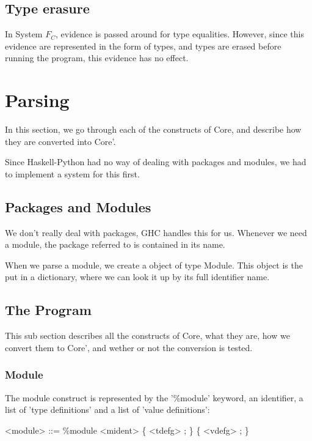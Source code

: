 \subsection{Type erasure}

In System $F_C$, evidence is passed around for type equalities. However,
since this evidence are represented in the form of types, and types are
erased before running the program, this evidence has no effect.
\cite{sulzmann2007system}

\section{Parsing}

In this section, we go through each of the constructs of Core, and describe
how they are converted into Core'.

Since Haskell-Python had no way of dealing with packages and modules, 
we had to implement a system for this first.

\subsection{Packages and Modules}

We don't really deal with packages, GHC handles this for us. Whenever we
need a module, the package referred to is contained in its name.

When we parse a module, we create a object of type Module. This object is
the put in a dictionary, where we can look it up by its full identifier name.

\subsection{The Program}


This sub section describes all the constructs of Core, what they are, how we 
convert them to Core', and wether or not the conversion is tested.

\subsubsection{Module}

The module construct is represented by the '\%module' keyword, an identifier,
a list of 'type definitions' and a list of 'value definitions':

\begin{grammar}
<module> ::= \%module <mident> \{ <tdefg> ; \} \{ <vdefg> ; \}
\end{grammar}


